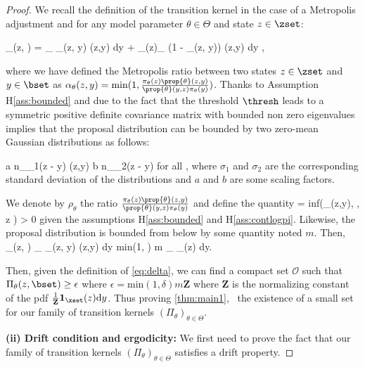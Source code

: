 \documentclass[10pt,twocolumn,letterpaper]{article}
\begin{document}
\begin{proof}
We recall the definition of the transition kernel in the case of a Metropolis adjustment and for any model parameter $\theta \in \Theta$ and state $z \in \zset$:

\beq 
\Pi_\theta(z, \bset) = \int_{\bset} \alpha_\theta(z, y) \prop{\theta}(z,y) \textrm{d}y + _{\bset(z)}\int_{\zset} (1 - \alpha_\theta(z, y)) \prop{\theta}(z,y) \textrm{d}y \eqsp,
\eeq

where we have defined the Metropolis ratio between two states $z \in \zset$ and $y \in \bset$ as $\alpha_\theta(z, y) = \textrm{min}(1, \frac{\pi_\theta(z)  \prop{\theta}(z,y)}{\prop{\theta}(y,z) \pi_\theta(y)  })$.
Thanks to Assumption H\ref{ass:bounded} and due to the fact that the threshold $\thresh$ leads to a symmetric positive definite covariance matrix with bounded non zero eigenvalues implies that the proposal distribution can be bounded by two zero-mean Gaussian distributions as follows:

\beq\label{eq:twogauss}
a n_{\sigma_1}(z - y) \leq \prop{\theta}(z,y)  \leq b n_{\sigma_2}(z - y) \quad \textrm{for all} \quad \theta \in \Theta\eqsp,
\eeq
where $\sigma_1$ and $\sigma_2$ are the corresponding standard deviation of the distributions and $a$ and $b$ are some scaling factors.

We denote by $\rho_\theta$ the ratio $\frac{\pi_\theta(z)  \prop{\theta}(z,y)}{\prop{\theta}(y,z) \pi_\theta(y)  }$ and define the quantity 
\beq\label{eq:delta}
\delta = \textrm{inf}(\rho_\theta(z,y), \theta \in \Theta, \quad z \in {} ) > 0
\eeq
 given the assumptions H\ref{ass:bounded} and H\ref{ass:contlogpi}.
Likewise, the proposal distribution is bounded from below by some quantity noted $m$.
Then,
\beq
\Pi_\theta(z, \bset) \geq  \int_{\bset \cap \xset} \alpha_\theta(z, y) \prop{\theta}(z,y) \textrm{d}y \geq \textrm{min}(1, \delta) m \int_{\bset} _\xset(z)  \textrm{d}y\eqsp.
\eeq

Then, given the definition of \eqref{eq:delta}, we can find a compact set $\mathcal{O}$ such that $\Pi_\theta(z, \bset) \geq  \epsilon$ where $\epsilon = \textrm{min}(1, \delta) m \textbf{Z}$ where $\textbf{Z}$ is the normalizing constant of the pdf $\frac{1}{\textbf{Z}}\mathbf{1}_\xset(z)  \textrm{d}y$.
Thus proving \eqref{thm:main1}, \ie\ the existence of a small set for our family of transition kernels $(\Pi_\theta)_{\theta \in \Theta}$.

\medskip
\noindent \textbf{(ii) Drift condition and ergodicity: }
We first need to prove the fact that our family of transition kernels $(\Pi_\theta)_{\theta \in \Theta}$ satisfies a drift property.


\end{proof}
\end{document}
